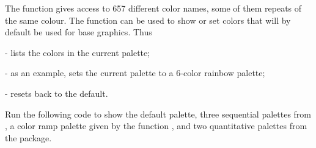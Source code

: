 The function  gives access to 657 different color names,
some of them repeats of the same colour. The function 
can be used to show or set colors that will by default be used for base
graphics.  Thus
\begin{itemizz}
  \item[-]  lists the colors in the current palette;
  \item[-] as an example,  sets the current
    palette to a 6-color rainbow palette;
  \item[-]  resets back to the default.
\end{itemizz}

  Run the following code to show the
default palette, three sequential palettes from , a
color ramp palette given by the function ,
and two quantitative palettes from the  package.

